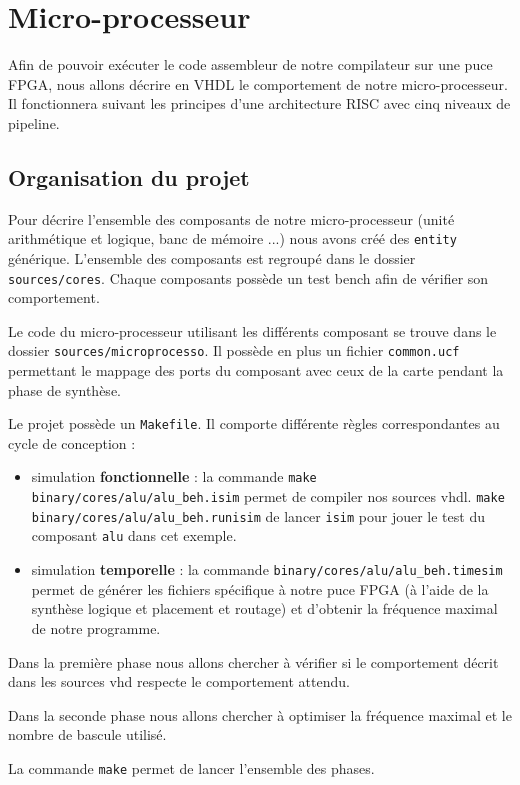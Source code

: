 
\section{Micro-processeur} \label{micro-processeur}
Afin de pouvoir exécuter le code assembleur de notre compilateur sur une puce FPGA, nous allons décrire en VHDL le comportement de notre micro-processeur. Il fonctionnera suivant les principes d'une architecture RISC avec cinq niveaux de pipeline. 

\subsection{Organisation du projet}
Pour décrire l'ensemble des composants de notre micro-processeur (unité arithmétique et logique, banc de mémoire ...) nous avons créé des \texttt{entity} générique. L'ensemble des composants est regroupé dans le dossier \texttt{sources/cores}. Chaque composants possède un test bench afin de vérifier son comportement. 

Le code du micro-processeur utilisant les différents composant se trouve dans le dossier \texttt{sources/microprocesso}. Il possède en plus un fichier \texttt{common.ucf} permettant le mappage des ports du composant avec ceux de la carte pendant la phase de synthèse. 

Le projet possède un \texttt{Makefile}. Il comporte différente règles correspondantes au cycle de conception : 
\begin{itemize}
\item simulation \textbf{fonctionnelle} : la commande \texttt{make binary/cores/alu/alu\_beh.isim} permet de compiler nos sources vhdl. \texttt{make binary/cores/alu/alu\_beh.runisim} de lancer \texttt{isim} pour jouer le test du composant \texttt{alu} dans cet exemple.
\item simulation \textbf{temporelle} : la commande \texttt{binary/cores/alu/alu\_beh.timesim} permet de générer les fichiers spécifique à notre puce FPGA (à l'aide de la synthèse logique et placement et routage) et d'obtenir la fréquence maximal de notre programme. 
\end{itemize}

Dans la première phase nous allons chercher à vérifier si le comportement décrit dans les sources vhd respecte le comportement attendu. 

Dans la seconde phase nous allons chercher à optimiser la fréquence maximal et le nombre de bascule utilisé.

La commande \texttt{make} permet de lancer l'ensemble des phases.

